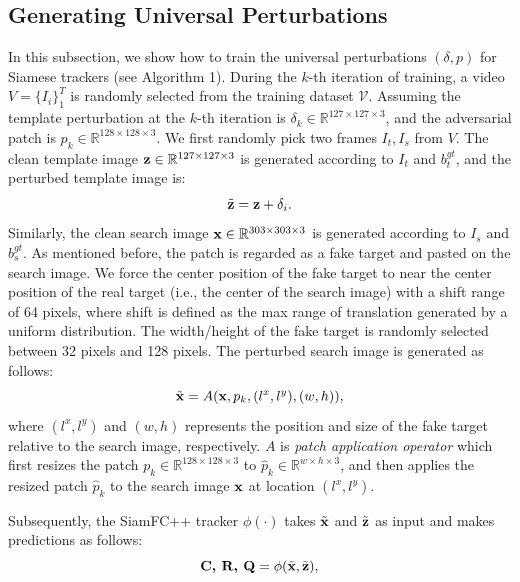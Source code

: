 \documentclass{article}
\begin{document}
\subsection{Generating Universal Perturbations}

In this subsection, we show how to train the universal perturbations $(\delta, p)$ for Siamese trackers (see Algorithm 1).
During the $k$-th iteration of training, a video $V=\{I_i\}_1^T$ is randomly selected from the training dataset $\mathcal V$. Assuming the template perturbation at the $k$-th iteration is $\delta_k \in \mathbb{R}^{127\times 127 \times 3}$, and the adversarial patch is $p_k \in \mathbb{R}^{128\times 128\times 3}$. We first randomly pick two frames $I_t, I_s$ from $V$.
The clean template image $\textbf z\in \mathbb{R}^{127\times 127 \times 3}$ is generated according to $I_t$ and $b^{gt}_t$, and the perturbed template image is:
\begin{equation}
\tilde {\textbf z} = \textbf z + \delta_i.
\end{equation}
Similarly, the clean search image $\textbf x \in \mathbb{R}^{303\times 303 \times 3}$ is generated according to $I_s$ and $b^{gt}_s$.
As mentioned before, the patch is regarded as a fake target and pasted on the search image. We force the center position of the fake target to near the center position of the real target (i.e., the center of the search image) with a shift range of 64 pixels, where shift is defined as the max range of translation generated by a uniform distribution.
The width/height of the fake target is randomly selected between 32 pixels and 128 pixels.
The perturbed search image is generated as follows:
\begin{equation}
\tilde{\textbf x} = A(\textbf x, p_k, (l^x, l^y), (w, h)),
\end{equation}
where $(l^x, l^y)$ and $(w, h)$ represents the position and size of the fake target relative to the search image, respectively. $A$ is \textit{patch application operator} \cite{patch} which first resizes the patch $p_k \in \mathbb{R}^{128\times 128\times 3}$ to $\hat{p}_k \in \mathbb{R}^{w\times h\times 3}$, and then applies the resized patch $\hat{p}_k$ to the search image $\textbf x$ at location $(l^x,l^y)$.

Subsequently, the SiamFC++ tracker $\phi(\cdot)$ takes $\tilde {\textbf x}$ and $\tilde{\textbf  z}$ as input and makes predictions as follows:
\begin{equation}
\textbf{C, R, Q} = \phi(\tilde {\textbf x}, \tilde{\textbf z}),
\end{equation}
\end{document}

